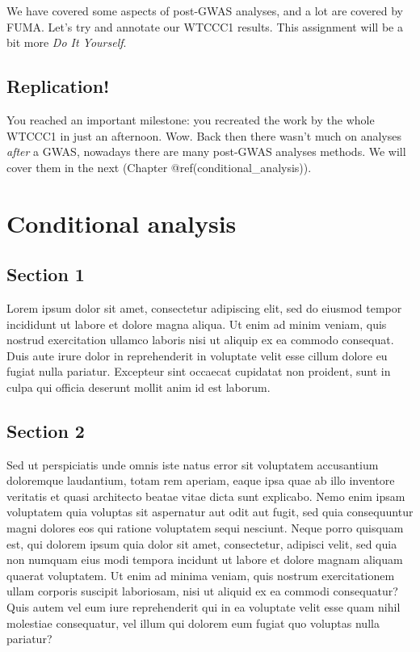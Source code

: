 \documentclass[
]{book}
\begin{document}
We have covered some aspects of post-GWAS analyses, and a lot are covered by FUMA. Let's try and annotate our WTCCC1 results. This assignment will be a bit more \emph{Do It Yourself}.

\hypertarget{replication-1}{%
\section{Replication!}\label{replication-1}}

You reached an important milestone: you recreated the work by the whole WTCCC1 in just an afternoon. Wow. Back then there wasn't much on analyses \emph{after} a GWAS, nowadays there are many post-GWAS analyses methods. We will cover them in the next (Chapter @ref(conditional\_analysis)).

\hypertarget{conditional-analysis}{%
\chapter{Conditional analysis}\label{conditional-analysis}}

\hypertarget{section-1}{%
\section{Section 1}\label{section-1}}

Lorem ipsum dolor sit amet, consectetur adipiscing elit, sed do eiusmod tempor incididunt ut labore et dolore magna aliqua. Ut enim ad minim veniam, quis nostrud exercitation ullamco laboris nisi ut aliquip ex ea commodo consequat. Duis aute irure dolor in reprehenderit in voluptate velit esse cillum dolore eu fugiat nulla pariatur. Excepteur sint occaecat cupidatat non proident, sunt in culpa qui officia deserunt mollit anim id est laborum.

\hypertarget{section-2}{%
\section{Section 2}\label{section-2}}

Sed ut perspiciatis unde omnis iste natus error sit voluptatem accusantium doloremque laudantium, totam rem aperiam, eaque ipsa quae ab illo inventore veritatis et quasi architecto beatae vitae dicta sunt explicabo. Nemo enim ipsam voluptatem quia voluptas sit aspernatur aut odit aut fugit, sed quia consequuntur magni dolores eos qui ratione voluptatem sequi nesciunt. Neque porro quisquam est, qui dolorem ipsum quia dolor sit amet, consectetur, adipisci velit, sed quia non numquam eius modi tempora incidunt ut labore et dolore magnam aliquam quaerat voluptatem. Ut enim ad minima veniam, quis nostrum exercitationem ullam corporis suscipit laboriosam, nisi ut aliquid ex ea commodi consequatur? Quis autem vel eum iure reprehenderit qui in ea voluptate velit esse quam nihil molestiae consequatur, vel illum qui dolorem eum fugiat quo voluptas nulla pariatur?
\end{document}
